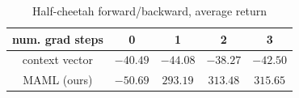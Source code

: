 \documentclass{article}
\begin{document}
\begin{table}
\caption{Half-cheetah forward/backward, average return }
\label{tbl:rei_cheetah}
\begin{center}
\begin{tabular}{c|c|c|c|c}
\hline
num. grad steps & 0 & 1   & 2 & 3\\
\hline
context vector  & $-40.49$ & $-44.08$ & $-38.27$ & $-42.50$ \\
\hline
MAML (ours) & $-50.69$ & $\mathbf{293.19}$ & $\mathbf{313.48}$ & $\mathbf{315.65}$ \\
\hline
\end{tabular}
\end{center}
\end{table}
\end{document}
